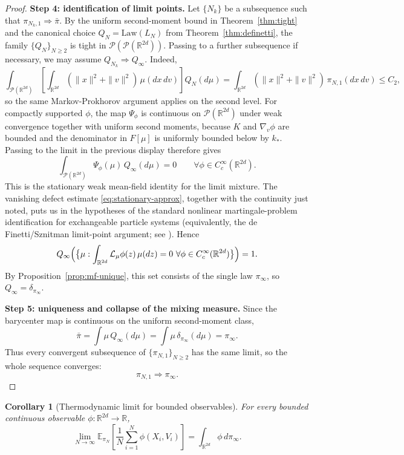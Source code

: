 \documentclass[11pt]{article}
\newtheorem{corollary}[theorem]{Corollary}
\theoremstyle{definition}
\theoremstyle{remark}
\newcommand{\R}{\mathbb{R}}
\newcommand{\E}{\mathbb{E}}
\newcommand{\Law}{\mathrm{Law}}
\newcommand{\mcP}{\mathcal{P}}
\begin{document}
\begin{proof}
\smallskip
\noindent
\textbf{Step 4: identification of limit points.}
Let $\{N_k\}$ be a subsequence such that $\pi_{N_k,1}\Rightarrow \bar\pi$.
By the uniform second-moment bound in Theorem~\ref{thm:tight} and the canonical
choice $Q_N=\Law(L_N)$ from Theorem~\ref{thm:definetti}, the family
$\{Q_N\}_{N\geq2}$ is tight in $\mcP(\mcP(\R^{2d}))$. Passing to a further
subsequence if necessary, we may assume $Q_{N_k}\Rightarrow Q_\infty$.
Indeed,
\[
\int_{\mcP(\R^{2d})}
\left[\int_{\R^{2d}}(\|x\|^2+\|v\|^2)\,\mu(dx\,dv)\right]Q_N(d\mu)
=
\int_{\R^{2d}}(\|x\|^2+\|v\|^2)\,\pi_{N,1}(dx\,dv)
\leq C_2,
\]
so the same Markov-Prokhorov argument applies on the second level.
For compactly supported $\phi$, the map $\Psi_\phi$ is continuous on
$\mcP(\R^{2d})$ under weak convergence together with uniform second moments,
because $K$ and $\nabla_v\phi$ are bounded and the denominator in $F[\mu]$ is
uniformly bounded below by $k_*$. Passing to the limit in the previous display
therefore gives
\[
\int_{\mcP(\R^{2d})}\Psi_\phi(\mu)\,Q_\infty(d\mu)=0
\qquad
\forall \phi\in C_c^\infty(\R^{2d}).
\]
This is the stationary weak mean-field identity for the limit mixture. The
vanishing defect estimate \eqref{eq:stationary-approx}, together with the
continuity just noted, puts us in the hypotheses of the standard nonlinear
martingale-problem identification for exchangeable particle systems
(equivalently, the de Finetti/Sznitman limit-point argument; see
\cite{sznitman1991topics}). Hence
\[
Q_\infty\Bigl(\bigl\{\mu:\int_{\R^{2d}}\mathcal L_\mu\phi(z)\,\mu(dz)=0
\ \forall \phi\in C_c^\infty(\R^{2d})\bigr\}\Bigr)=1.
\]
By Proposition~\ref{prop:mf-unique}, this set consists of the single law
\(\pi_\infty\), so \(Q_\infty=\delta_{\pi_\infty}\).

\smallskip
\noindent
\textbf{Step 5: uniqueness and collapse of the mixing measure.}
Since the barycenter map is continuous on the uniform second-moment class,
\[
\bar\pi
=
\int \mu\,Q_\infty(d\mu)
=
\int \mu\,\delta_{\pi_\infty}(d\mu)
=
\pi_\infty.
\]
Thus every convergent subsequence of $\{\pi_{N,1}\}_{N\geq2}$ has the same
limit, so the whole sequence converges:
\[
\pi_{N,1}\Rightarrow \pi_\infty.
\]
\end{proof}

\begin{corollary}[Thermodynamic limit for bounded observables]\label{cor:obs}
For every bounded continuous observable $\phi:\R^{2d}\to\R$,
\[
\lim_{N\to\infty}
\E_{\pi_N}\!\left[\frac1N\sum_{i=1}^N \phi(X_i,V_i)\right]
=
\int_{\R^{2d}} \phi\,d\pi_\infty.
\]
\end{corollary}
\end{document}
